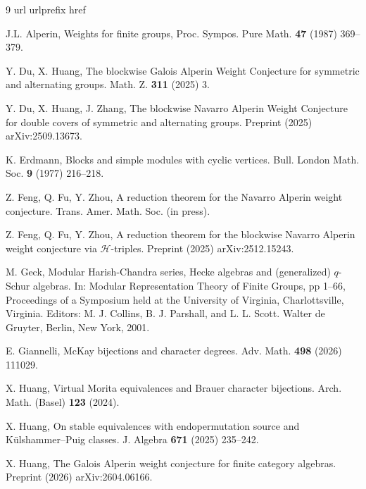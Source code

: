 \documentclass[preprint,12pt,3p]{elsarticle}
\begin{document}

\begin{thebibliography}{9}
	\expandafter\ifx\csname url\endcsname\relax
	\def\url#1{\texttt{#1}}\fi
	\expandafter\ifx\csname urlprefix\endcsname\relax\def\urlprefix{URL }\fi
	\expandafter\ifx\csname href\endcsname\relax
	\def\href#1#2{#2} \def\path#1{#1}\fi
	


J.L. Alperin, Weights for finite groups, Proc. Sympos. Pure Math. {\bf 47} (1987) 369--379.	
	
Y. Du, X. Huang, The blockwise Galois Alperin Weight Conjecture for symmetric and alternating groups. Math. Z. {\bf 311} (2025) 3.

Y. Du, X. Huang, J. Zhang, The blockwise Navarro Alperin Weight Conjecture for double covers of symmetric and alternating groups. Preprint (2025) arXiv:2509.13673.

K. Erdmann, Blocks and simple modules with cyclic vertices. Bull. London Math. Soc. {\bf 9} (1977) 216--218.
    
Z. Feng, Q. Fu, Y. Zhou, A reduction theorem for the Navarro Alperin weight conjecture.	Trans. Amer. Math. Soc. (in press). 
	
Z. Feng, Q. Fu, Y. Zhou, A reduction theorem for the blockwise Navarro Alperin weight conjecture via $\mathcal{H}$-triples. Preprint (2025) arXiv:2512.15243.

M. Geck, Modular Harish-Chandra series, Hecke algebras and (generalized) $q$-Schur algebras. In: Modular Representation Theory of Finite Groups, pp 1--66, Proceedings of a Symposium held at the University of Virginia, Charlottsville, Virginia. Editors: M. J. Collins, B. J. Parshall, and L. L. Scott. Walter de Gruyter, Berlin, New York, 2001.

E. Giannelli, McKay bijections and character degrees. Adv. Math. {\bf498} (2026) 111029.

X. Huang, Virtual Morita equivalences and Brauer character bijections. Arch. Math. (Basel) {\bf 123} (2024).

X. Huang, On stable equivalences with endopermutation source and K\"ulshammer--Puig classes. J. Algebra {\bf 671} (2025) 235--242.

X. Huang, The Galois Alperin weight conjecture for finite category algebras. Preprint (2026) arXiv:2604.06166.


\end{thebibliography}
\end{document}
